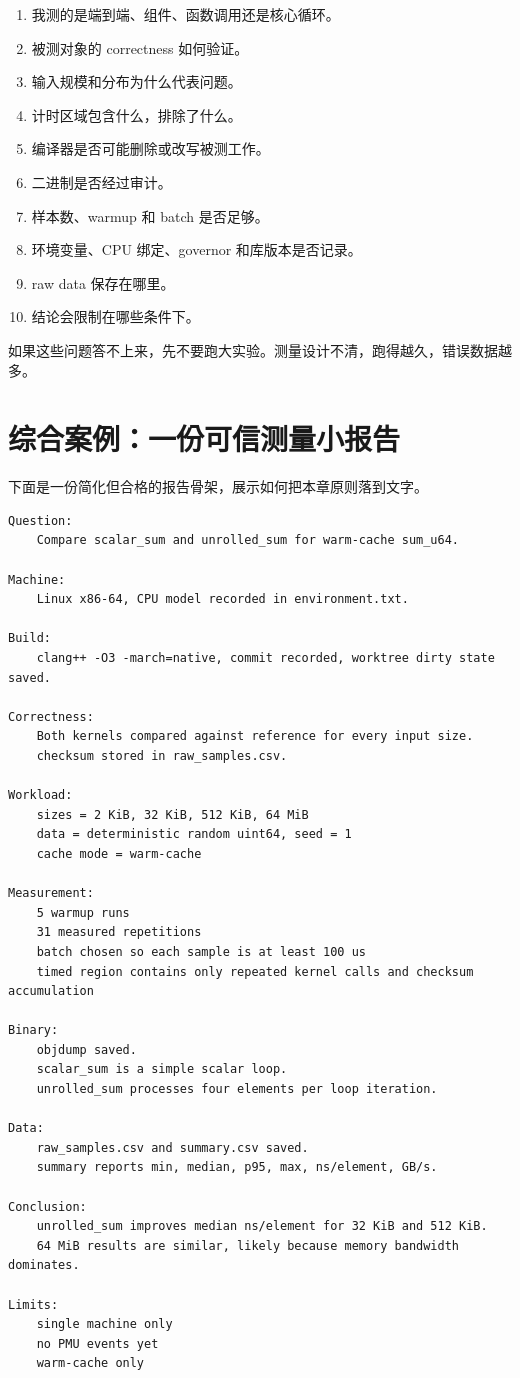 \begin{enumerate}
  \item 我测的是端到端、组件、函数调用还是核心循环。
  \item 被测对象的 correctness 如何验证。
  \item 输入规模和分布为什么代表问题。
  \item 计时区域包含什么，排除了什么。
  \item 编译器是否可能删除或改写被测工作。
  \item 二进制是否经过审计。
  \item 样本数、warmup 和 batch 是否足够。
  \item 环境变量、CPU 绑定、governor 和库版本是否记录。
  \item raw data 保存在哪里。
  \item 结论会限制在哪些条件下。
\end{enumerate}

如果这些问题答不上来，先不要跑大实验。测量设计不清，跑得越久，错误数据越多。

\section{综合案例：一份可信测量小报告}

下面是一份简化但合格的报告骨架，展示如何把本章原则落到文字。

\begin{lstlisting}
Question:
    Compare scalar_sum and unrolled_sum for warm-cache sum_u64.

Machine:
    Linux x86-64, CPU model recorded in environment.txt.

Build:
    clang++ -O3 -march=native, commit recorded, worktree dirty state saved.

Correctness:
    Both kernels compared against reference for every input size.
    checksum stored in raw_samples.csv.

Workload:
    sizes = 2 KiB, 32 KiB, 512 KiB, 64 MiB
    data = deterministic random uint64, seed = 1
    cache mode = warm-cache

Measurement:
    5 warmup runs
    31 measured repetitions
    batch chosen so each sample is at least 100 us
    timed region contains only repeated kernel calls and checksum accumulation

Binary:
    objdump saved.
    scalar_sum is a simple scalar loop.
    unrolled_sum processes four elements per loop iteration.

Data:
    raw_samples.csv and summary.csv saved.
    summary reports min, median, p95, max, ns/element, GB/s.

Conclusion:
    unrolled_sum improves median ns/element for 32 KiB and 512 KiB.
    64 MiB results are similar, likely because memory bandwidth dominates.

Limits:
    single machine only
    no PMU events yet
    warm-cache only
\end{lstlisting}

